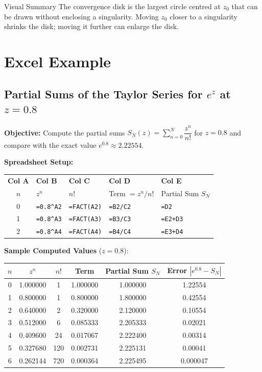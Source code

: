 \documentclass[12pt,a4paper]{article}
\begin{document}
\begin{learnbox}{Visual Summary}
The convergence disk is the largest circle centred at $z_0$ that can be drawn without enclosing a singularity. Moving $z_0$ closer to a singularity shrinks the disk; moving it further can enlarge the disk.
\end{learnbox}

\section{Excel Example}

\subsection*{Partial Sums of the Taylor Series for $e^z$ at $z = 0.8$}

\textbf{Objective:} Compute the partial sums $S_N(z) = \sum_{n=0}^{N}\dfrac{z^n}{n!}$ for $z = 0.8$ and compare with the exact value $e^{0.8} \approx 2.22554$.

\medskip
\noindent\textbf{Spreadsheet Setup:}

\begin{center}
\begin{tabular}{cllll}
\toprule
\textbf{Col A} & \textbf{Col B} & \textbf{Col C} & \textbf{Col D} & \textbf{Col E} \\
$n$ & $z^n$ & $n!$ & Term $= z^n/n!$ & Partial Sum $S_N$ \\
\midrule
0 & \texttt{=0.8\^{}A2} & \texttt{=FACT(A2)} & \texttt{=B2/C2} & \texttt{=D2} \\
1 & \texttt{=0.8\^{}A3} & \texttt{=FACT(A3)} & \texttt{=B3/C3} & \texttt{=E2+D3} \\
2 & \texttt{=0.8\^{}A4} & \texttt{=FACT(A4)} & \texttt{=B4/C4} & \texttt{=E3+D4} \\
\bottomrule
\end{tabular}
\end{center}

\medskip
\noindent\textbf{Sample Computed Values} ($z = 0.8$):

\begin{center}
\begin{tabular}{cccccc}
\toprule
$n$ & $z^n$ & $n!$ & Term & Partial Sum $S_N$ & Error $|e^{0.8} - S_N|$ \\
\midrule
0 & 1.000000 & 1 & 1.000000 & 1.000000 & 1.22554 \\
1 & 0.800000 & 1 & 0.800000 & 1.800000 & 0.42554 \\
2 & 0.640000 & 2 & 0.320000 & 2.120000 & 0.10554 \\
3 & 0.512000 & 6 & 0.085333 & 2.205333 & 0.02021 \\
4 & 0.409600 & 24 & 0.017067 & 2.222400 & 0.00314 \\
5 & 0.327680 & 120 & 0.002731 & 2.225131 & 0.00041 \\
6 & 0.262144 & 720 & 0.000364 & 2.225495 & 0.000047 \\
\bottomrule
\end{tabular}
\end{center}
\end{document}
